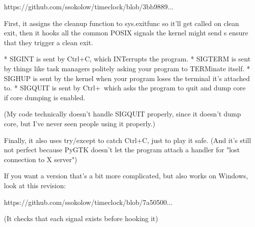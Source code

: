https://github.com/ssokolow/timeclock/blob/3bb9889...

First, it assigns the cleanup function to sys.exitfunc so it'll get called on clean exit, then it hooks all the common POSIX signals the kernel might send s ensure that they trigger a clean exit.

* SIGINT is sent by Ctrl+C, which INTerrupts the program.
* SIGTERM is sent by things like task managers politely asking your program to TERMinate itself.
* SIGHUP is sent by the kernel when your program loses the terminal it's attached to.
* SIGQUIT is sent by Ctrl+\, which asks the program to quit and dump core if core dumping is enabled.

(My code technically doesn't handle SIGQUIT properly, since it doesn't dump core, but I've never seen people using it properly.)

Finally, it also uses try/except to catch Ctrl+C, just to play it safe. (And it's still not perfect because PyGTK doesn't let the program attach a handler for "lost connection to X server")

If you want a version that's a bit more complicated, but also works on Windows, look at this revision:

https://github.com/ssokolow/timeclock/blob/7a50500...

(It checks that each signal exists before hooking it)
